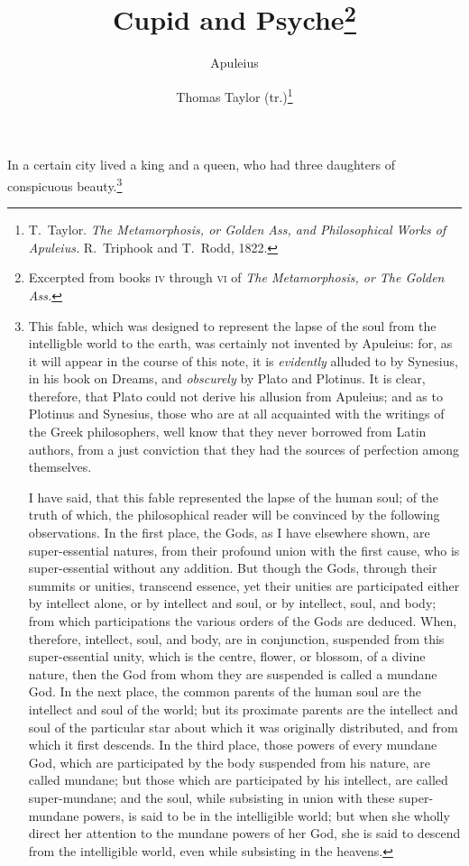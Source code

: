 \documentclass[12pt]{article}
\title{Cupid and Psyche\footnote{Excerpted from books \textsc{iv} through
\textsc{vi} of \textit{The Metamorphosis, or The Golden Ass.}}}
\author{Apuleius \and Thomas Taylor (tr.)\footnote{T.~Taylor. \textit{The
Metamorphosis, or Golden Ass, and Philosophical Works of Apuleius.} R.~Triphook
and T.~Rodd, 1822.}}
\date{}
\begin{document}
\maketitle

\noindent In a certain city lived a king and a queen, who had three daughters
of conspicuous beauty.\footnote{This fable, which was designed to represent the
lapse of the soul from the intelligble world to the earth, was certainly not
invented by Apuleius: for, as it will appear in the course of this note, it is
\textit{evidently} alluded to by Synesius, in his book on Dreams, and
\textit{obscurely} by Plato and Plotinus. It is clear, therefore, that Plato
could not derive his allusion from Apuleius; and as to Plotinus and Synesius,
those who are at all acquainted with the writings of the Greek philosophers,
well know that they never borrowed from Latin authors, from a just conviction
that they had the sources of perfection among themselves.

I have said, that this fable represented the lapse of the human soul; of the
truth of which, the philosophical reader will be convinced by the following
observations. In the first place, the Gods, as I have elsewhere shown, are
super-essential natures, from their profound union with the first cause, who is
super-essential without any addition. But though the Gods, through their
summits or unities, transcend essence, yet their unities are participated
either by intellect alone, or by intellect and soul, or by intellect, soul, and
body; from which participations the various orders of the Gods are deduced.
When, therefore, intellect, soul, and body, are in conjunction, suspended from
this super-essential unity, which is the centre, flower, or blossom, of a
divine nature, then the God from whom they are suspended is called a mundane
God. In the next place, the common parents of the human soul are the intellect
and soul of the world; but its proximate parents are the intellect and soul of
the particular star about which it was originally distributed, and from which
it first descends. In the third place, those powers of every mundane God, which
are participated by the body suspended from his nature, are called mundane; but
those which are participated by his intellect, are called super-mundane; and
the soul, while subsisting in union with these super-mundane powers, is said to
be in the intelligible world; but when she wholly direct her attention to the
mundane powers of her God, she is said to descend from the intelligible world,
even while subsisting in the heavens.

}
\end{document}
